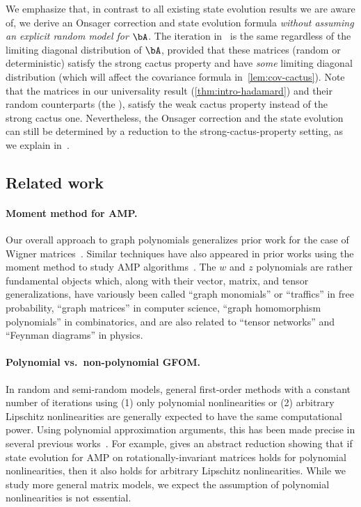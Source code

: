 We emphasize that, in contrast to all existing state evolution results we are aware of, we derive an Onsager correction and state evolution formula \emph{without assuming an explicit random model for $\bA$}.
The iteration in~ is the same regardless of the limiting diagonal distribution of $\bA$, provided that these matrices (random or deterministic) satisfy the strong cactus property and have \emph{some} limiting diagonal distribution (which will affect the covariance formula in~\cref{lem:cov-cactus}).
Note that the matrices in our universality result (\cref{thm:intro-hadamard}) and their random counterparts (the \rrom), satisfy the weak cactus property instead of the strong cactus one.
Nevertheless, the Onsager correction and the state evolution can still be determined by a reduction to the strong-cactus-property setting, as we explain in~.

\subsection{Related work}
\label{sec:related}

\paragraph{Moment method for AMP.}
Our overall approach to graph polynomials generalizes prior work for the case of Wigner matrices~\cite{jones2025fourier}.
Similar techniques have also appeared in prior works using the moment method to study AMP algorithms~\cite{bayati2015universality, wang2022universality, montanari2022equivalence, dudeja2023universality, ivkov2023semidefinite, dudeja2024spectral}.
The $w$ and $z$ polynomials are rather fundamental objects which,
along with their vector, matrix, and tensor generalizations,
have variously been called
``graph monomials'' or ``traffics'' in free probability,
``graph matrices'' in computer science,
``graph homomorphism polynomials'' in combinatorics,
and are also related to ``tensor networks'' and ``Feynman diagrams'' in physics.

\paragraph{Polynomial vs.\ non-polynomial GFOM.}
    In random and semi-random models, general
    first-order methods with a constant number of
    iterations using (1) only polynomial
    nonlinearities or (2) arbitrary Lipschitz
    nonlinearities are generally 
    expected to have the same
    computational power. Using polynomial approximation arguments, this has been
    made precise in several previous works~\cite{montanari2022equivalence,ivkov2023semidefinite,wang2022universality}. For example,
    \cite[Lemma 2.12]{wang2022universality} gives
    an abstract reduction
    showing
    that if state evolution for AMP on rotationally-invariant matrices holds for polynomial
    nonlinearities, then it also
    holds for arbitrary Lipschitz nonlinearities.
    While we study more general matrix models, we expect the assumption of polynomial nonlinearities is not essential.


